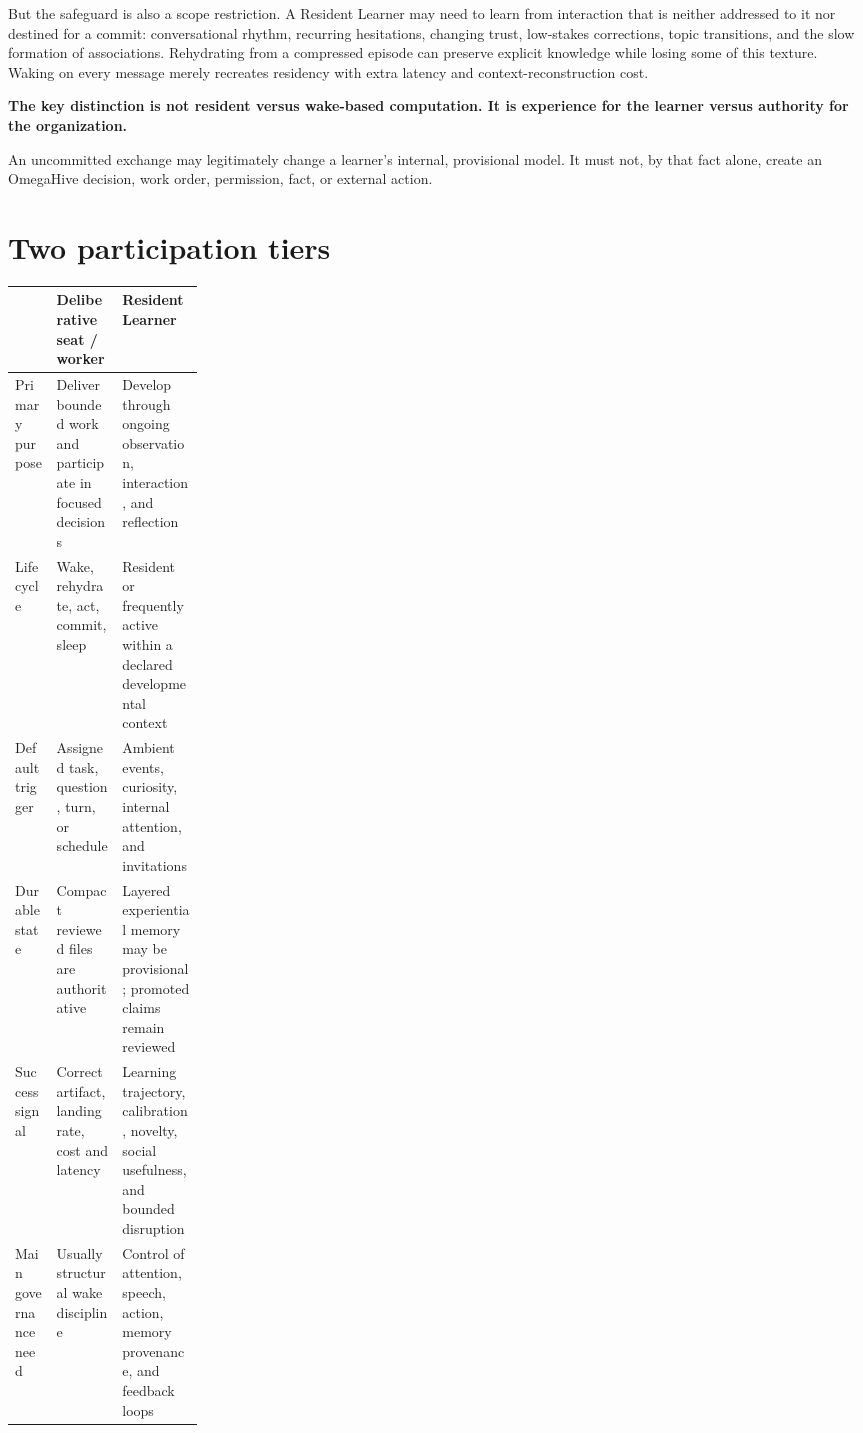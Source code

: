 \documentclass[11pt]{article}
\newcommand{\principle}[1]{%
  \vspace{3pt}\noindent\colorbox{light}{%
    \parbox{\dimexpr\linewidth-2\fboxsep}{\textbf{\color{navy}#1}}}\vspace{3pt}}
\begin{document}
But the safeguard is also a scope restriction. A Resident Learner may need to
learn from interaction that is neither addressed to it nor destined for a
commit: conversational rhythm, recurring hesitations, changing trust,
low-stakes corrections, topic transitions, and the slow formation of
associations. Rehydrating from a compressed episode can preserve explicit
knowledge while losing some of this texture. Waking on every message merely
recreates residency with extra latency and context-reconstruction cost.

\principle{The key distinction is not resident versus wake-based computation.
It is experience for the learner versus authority for the organization.}

An uncommitted exchange may legitimately change a learner's internal,
provisional model. It must not, by that fact alone, create an OmegaHive
decision, work order, permission, fact, or external action.

\section{Two participation tiers}

\begin{tabularx}{\linewidth}{@{}p{0.22\linewidth}XX@{}}
\toprule
 & \textbf{Deliberative seat / worker} & \textbf{Resident Learner} \\
\midrule
Primary purpose & Deliver bounded work and participate in focused decisions &
Develop through ongoing observation, interaction, and reflection \\
Lifecycle & Wake, rehydrate, act, commit, sleep & Resident or frequently active
within a declared developmental context \\
Default trigger & Assigned task, question, turn, or schedule & Ambient events,
curiosity, internal attention, and invitations \\
Durable state & Compact reviewed files are authoritative & Layered experiential
memory may be provisional; promoted claims remain reviewed \\
Success signal & Correct artifact, landing rate, cost and latency & Learning
trajectory, calibration, novelty, social usefulness, and bounded disruption \\
Main governance need & Usually structural wake discipline & Control of
attention, speech, action, memory provenance, and feedback loops \\
\bottomrule
\end{tabularx}
\end{document}
